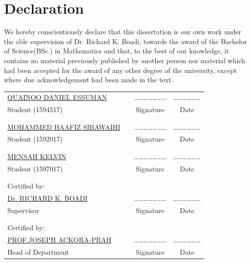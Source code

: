 		\chapter*{Declaration}
We hereby conscientiously declare that this dissertation is our own work under the able supervision of Dr. Richard K. Boadi, towards the award of the Bachelor of Science(BSc.) in Mathematics and that, to the best of our knowledge, it contains no material previously published by another person nor material which had been accepted for the award of any other degree of the university, except where due acknowledgement had been made in the text.\\

\begin{center}
 \begin{tabular}{llcc}
 	\underline{QUAINOO DANIEL ESSUMAN} & &\quad\quad\quad \ldots\ldots\ldots\ldots\ldots\ldots\ldots &\quad\quad\quad \ldots\ldots\ldots\ldots\ldots\ldots \\
 	Student (1594517) & &\quad\quad\quad Signature &\quad\quad\quad Date \\
 	& & & \\
 	& & & \\
 \underline{ MOHAMMED HAAFIZ SIBAWAIHI} & &\quad\quad\quad \ldots\ldots\ldots\ldots\ldots\ldots\ldots &\quad\quad\quad \ldots\ldots\ldots\ldots\ldots\ldots \\
 Student (1592017)& &\quad\quad\quad Signature &\quad\quad\quad Date \\
 & & & \\
 & & & \\
  \underline{ MENSAH KELVIN } & &\quad\quad\quad \ldots\ldots\ldots\ldots\ldots\ldots\ldots &\quad\quad\quad \ldots\ldots\ldots\ldots\ldots\ldots \\
  Student (1597017) & &\quad\quad\quad Signature &\quad\quad\quad Date \\
  & & & \\
  & & & \\
  Certified by: & & &\\
 \underline{Dr. RICHARD K. BOADI} & &\quad\quad\quad \ldots\ldots\ldots\ldots\ldots\ldots\ldots &\quad\quad\quad \ldots\ldots\ldots\ldots\ldots\ldots \\
 Supervisor & &\quad\quad\quad Signature &\quad\quad\quad Date \\
 & & & \\
 & & & \\
 Certified by: & & &\\
 \underline{PROF.JOSEPH ACKORA-PRAH } & &\quad\quad\quad \ldots\ldots\ldots\ldots\ldots\ldots\ldots &\quad\quad\quad \ldots\ldots\ldots\ldots\ldots\ldots \\
 Head of Department & &\quad\quad\quad Signature &\quad\quad\quad Date
\end{tabular}
\end{center}
